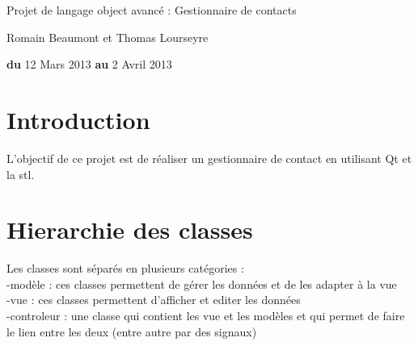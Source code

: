 \documentclass{report}
\begin{document}
\begin{titlepage}
\begin{center}
\end{center}

\flushright
\begin{center}
\bigskip
\bigskip
\bigskip
\bigskip
\bigskip
\bigskip
\bigskip
\bigskip
\bigskip
\bigskip
\bigskip
\bigskip
\huge{Projet de langage object avancé : Gestionnaire de contacts}\\
\end{center}
\begin{center}
\bigskip
\bigskip
\bigskip
\bigskip
\bigskip
\bigskip
\bigskip
\bigskip
\bigskip
Romain Beaumont et Thomas Lourseyre\\
\bigskip
\bigskip
\bigskip
\bigskip
\bigskip
\bigskip
\bigskip
\bigskip
\bigskip
\bigskip
\bigskip
\bigskip
\bigskip
\bigskip
\bigskip

\textbf{du} 12 Mars 2013  \textbf{au} 2 Avril 2013

\bigskip
\bigskip
\bigskip
\end{center}
\end{titlepage}
 
\tableofcontents


\chapter{Introduction}
\par
L'objectif de ce projet est de réaliser un gestionnaire de contact en utilisant Qt et la stl.

\chapter{Hierarchie des classes}
\par
Les classes sont séparés en plusieurs catégories :\\
-modèle : ces classes permettent de gérer les données et de les adapter à la vue\\
-vue : ces classes permettent d'afficher et editer les données\\
-controleur : une classe qui contient les vue et les modèles et qui permet de faire le lien entre les deux (entre autre par des signaux)\\
\end{document}
